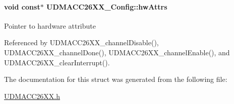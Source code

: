 \paragraph[{hw\-Attrs}]{\setlength{\rightskip}{0pt plus 5cm}void const$\ast$ U\-D\-M\-A\-C\-C26\-X\-X\-\_\-\-Config\-::hw\-Attrs}\label{struct_u_d_m_a_c_c26_x_x___config_a394867c60268267c4c503fb10100d960}
Pointer to hardware attribute 

Referenced by U\-D\-M\-A\-C\-C26\-X\-X\-\_\-channel\-Disable(), U\-D\-M\-A\-C\-C26\-X\-X\-\_\-channel\-Done(), U\-D\-M\-A\-C\-C26\-X\-X\-\_\-channel\-Enable(), and U\-D\-M\-A\-C\-C26\-X\-X\-\_\-clear\-Interrupt().



The documentation for this struct was generated from the following file\-:\begin{DoxyCompactItemize}
\item 
\hyperlink{_u_d_m_a_c_c26_x_x_8h}{U\-D\-M\-A\-C\-C26\-X\-X.\-h}\end{DoxyCompactItemize}
